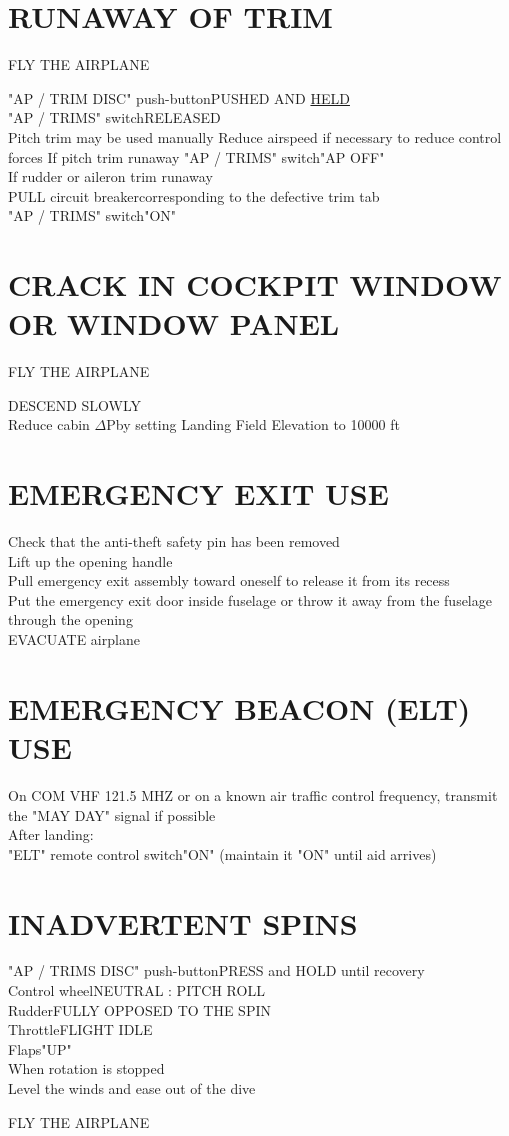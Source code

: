 \documentclass{article}
\newcommand{\fly}{\vspace{-1em}\begin{center}\color{Green}FLY THE AIRPLANE\end{center}\vspace{-1em}}
\begin{document}
\begin{multicols*}{2}
\section*{RUNAWAY OF TRIM}
\vspace{1em}
\fly
"AP / TRIM DISC" push-button\dotfill PUSHED AND \underline{HELD}\\
"AP / TRIMS" switch\dotfill RELEASED\\
Pitch trim may be used manually
Reduce airspeed if necessary to reduce control forces
If pitch trim runaway
"AP / TRIMS" switch\dotfill "AP OFF"\\
If rudder or aileron trim runaway\\
PULL circuit breaker\dotfill corresponding to the defective trim tab\\
"AP / TRIMS" switch\dotfill "ON"\\
\section*{CRACK IN COCKPIT WINDOW OR WINDOW PANEL}
\vspace{1em}
\fly
DESCEND SLOWLY\\
Reduce cabin $\Delta$P\dotfill by setting Landing Field Elevation to 10000 ft\\
\vfill\null
\section*{EMERGENCY EXIT USE}
Check that the anti-theft safety pin has been removed\\
Lift up the opening handle\\
Pull emergency exit assembly toward oneself to release it from its recess\\
Put the emergency exit door inside fuselage or throw it away from the fuselage through the opening\\
EVACUATE airplane
\section*{EMERGENCY BEACON (ELT) USE}
On COM VHF 121.5 MHZ or on a known air traffic control frequency, transmit the "MAY DAY" signal if possible\\
After landing:\\
\hspace*{6mm} "ELT" remote control switch\dotfill "ON" (maintain it "ON" until aid arrives)
\section*{INADVERTENT SPINS}
"AP / TRIMS DISC" push-button\dotfill PRESS and HOLD until recovery\\
Control wheel\dotfill NEUTRAL : PITCH ROLL\\
Rudder\dotfill FULLY OPPOSED TO THE SPIN\\
Throttle\dotfill FLIGHT IDLE\\
Flaps\dotfill "UP"\\
When rotation is stopped\\
Level the winds and ease out of the dive
\fly

\end{multicols*}
\end{document}
